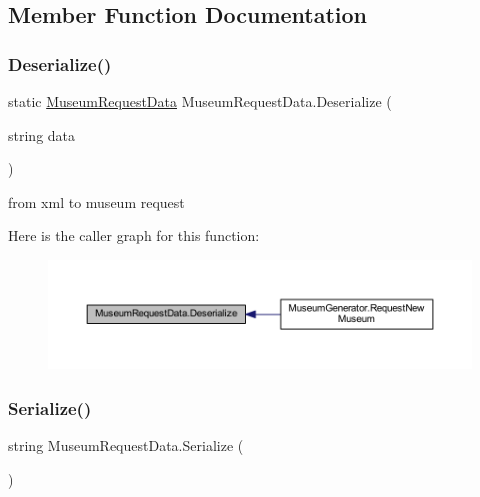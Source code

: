 \subsection{Member Function Documentation}
\mbox{\label{class_museum_request_data_a927b5c1b4ac92161315f7bb717b7c6e6}} 
\subsubsection{\texorpdfstring{Deserialize()}{Deserialize()}}
{\footnotesize\ttfamily static \mbox{\hyperlink{class_museum_request_data}{Museum\+Request\+Data}} Museum\+Request\+Data.\+Deserialize (\begin{DoxyParamCaption}\item[{string}]{data }\end{DoxyParamCaption})\hspace{0.3cm}{\ttfamily [static]}}



from xml to museum request 

Here is the caller graph for this function\+:
\nopagebreak
\begin{figure}[H]
\begin{center}
\leavevmode
\includegraphics[width=350pt]{class_museum_request_data_a927b5c1b4ac92161315f7bb717b7c6e6_icgraph}
\end{center}
\end{figure}
\mbox{\label{class_museum_request_data_ac2ab3cbc8d51ee55b5b23fe2cf9e93f3}} 
\subsubsection{\texorpdfstring{Serialize()}{Serialize()}}
{\footnotesize\ttfamily string Museum\+Request\+Data.\+Serialize (\begin{DoxyParamCaption}{ }\end{DoxyParamCaption})}



